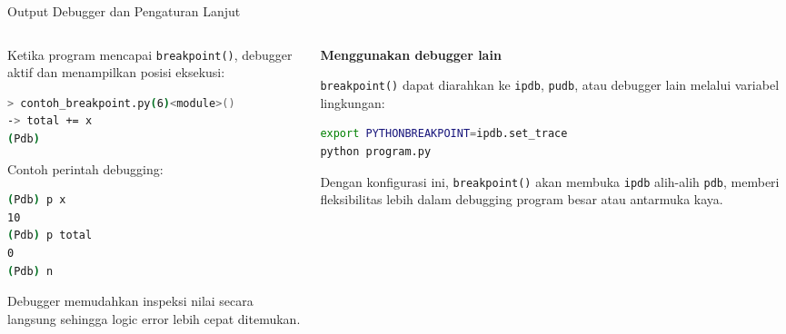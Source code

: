 \documentclass[aspectratio=169, table]{beamer}
\begin{document}
\begin{frame}[fragile]{Output Debugger dan Pengaturan Lanjut}
\vspace{10pt}

\begin{columns}[T]
\begin{column}{0.57\linewidth}
Ketika program mencapai \texttt{breakpoint()}, debugger aktif
dan menampilkan posisi eksekusi:

\begin{lstlisting}[language=bash, basicstyle=\ttfamily\scriptsize]
> contoh_breakpoint.py(6)<module>()
-> total += x
(Pdb)
\end{lstlisting}

Contoh perintah debugging:
\begin{lstlisting}[language=bash, basicstyle=\ttfamily\scriptsize]
(Pdb) p x
10
(Pdb) p total
0
(Pdb) n
\end{lstlisting}

Debugger memudahkan inspeksi nilai secara langsung sehingga
logic error lebih cepat ditemukan.
\end{column}

\begin{column}{0.38\linewidth}
\textbf{Menggunakan debugger lain}

\texttt{breakpoint()} dapat diarahkan ke \texttt{ipdb},
\texttt{pudb}, atau debugger lain melalui variabel lingkungan:

\begin{lstlisting}[language=bash, basicstyle=\ttfamily\scriptsize]
export PYTHONBREAKPOINT=ipdb.set_trace
python program.py
\end{lstlisting}

Dengan konfigurasi ini, \texttt{breakpoint()} akan membuka
\texttt{ipdb} alih-alih \texttt{pdb}, memberi fleksibilitas
lebih dalam debugging program besar atau antarmuka kaya.
\end{column}
\end{columns}

\end{frame}
\end{document}
